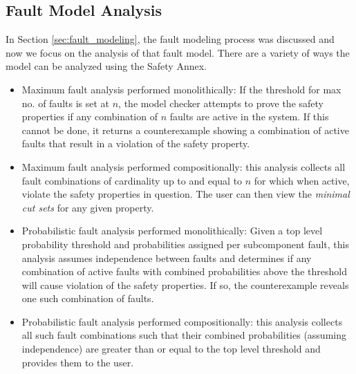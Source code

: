 \subsection{Fault Model Analysis}

In Section \ref{sec:fault_modeling}, the fault modeling process was discussed and now we focus on the analysis of that fault model. There are a variety of ways the model can be analyzed using the Safety Annex. 

\begin{itemize}
\item Maximum fault analysis performed monolithically: If the threshold for max no. of faults is set at $n$, the model checker attempts to prove the safety properties if any combination of $n$ faults are active in the system. If this cannot be done, it returns a counterexample showing a combination of active faults that result in a violation of the safety property. 

\item Maximum fault analysis performed compositionally: this analysis collects all fault combinations of cardinality up to and equal to $n$ for which when active, violate the safety properties in question. The user can then view the \textit{minimal cut sets} for any given property. 

\item Probabilistic fault analysis performed monolithically: Given a top level probability threshold and probabilities assigned per subcomponent fault, this analysis assumes independence between faults and determines if any combination of active faults with combined probabilities above the threshold will cause violation of the safety properties. If so, the counterexample reveals one such combination of faults. 

\item Probabilistic fault analysis performed compositionally: this analysis collects all such fault combinations such that their combined probabilities (assuming independence) are greater than or equal to the top level threshold and provides them to the user. 
\end{itemize}

